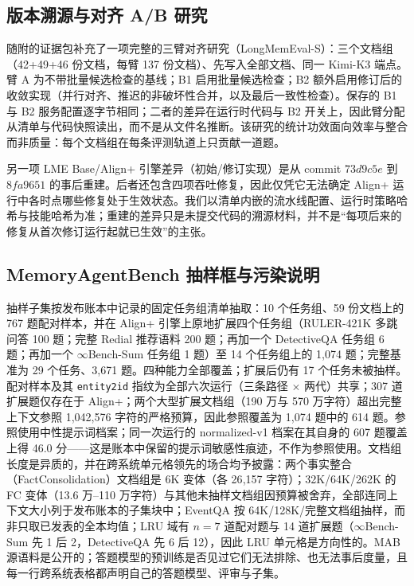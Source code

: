 \subsection{版本溯源与对齐 A/B 研究}
\label{app:alignment-ab}

随附的证据包补充了一项完整的三臂对齐研究（LongMemEval-S）：三个文档组（42+49+46 份文档，每臂 137 份文档）、先写入全部文档、同一 Kimi-K3 端点。臂 A 为不带批量候选检查的基线；B1 启用批量候选检查；B2 额外启用修订后的收敛实现（并行对齐、推迟的非破坏性合并，以及最后一致性检查）。保存的 B1 与 B2 服务配置逐字节相同；二者的差异在运行时代码与 B2 开关上，因此臂分配从清单与代码快照读出，而不是从文件名推断。该研究的统计功效面向效率与整合而非质量：每个文档组在每条评测轨道上只贡献一道题。

另一项 LME Base/Align+ 引擎差异（初始/修订实现）是从 commit $73d9c5e$ 到 $8fa9651$ 的事后重建。后者还包含四项吞吐修复，因此仅凭它无法确定 Align+ 运行中各时点哪些修复处于生效状态。我们以清单内嵌的流水线配置、运行时策略哈希与技能哈希为准；重建的差异只是未提交代码的溯源材料，并不是“每项后来的修复从首次修订运行起就已生效”的主张。

\subsection{MemoryAgentBench 抽样框与污染说明}
\label{app:sampling}

抽样子集按发布账本中记录的固定任务组清单抽取：10 个任务组、59 份文档上的 767 题配对样本，并在 Align+ 引擎上原地扩展四个任务组（RULER-421K 多跳问答 100 题；完整 Redial 推荐语料 200 题；再加一个 DetectiveQA 任务组 6 题；再加一个 $\infty$Bench-Sum 任务组 1 题）至 14 个任务组上的 1{,}074 题；完整基准为 29 个任务、3{,}671 题。四种能力全部覆盖；扩展后仍有 17 个任务未被抽样。配对样本及其 \texttt{entity2id} 指纹为全部六次运行（三条路径 $\times$ 两代）共享；307 道扩展题仅存在于 Align+；两个大型扩展文档组（190 万与 570 万字符）超出完整上下文参照 1{,}042{,}576 字符的严格预算，因此参照覆盖为 1{,}074 题中的 614 题。参照使用中性提示词档案；同一次运行的 normalized-v1 档案在其自身的 607 题覆盖上得 46.0 分——这是账本中保留的提示词敏感性痕迹，不作为参照使用。文档组长度是异质的，并在跨系统单元格领先的场合均予披露：两个事实整合（FactConsolidation）文档组是 6K 变体（各 26{,}157 字符）；32K/64K/262K 的 FC 变体（13.6 万--110 万字符）与其他未抽样文档组因预算被舍弃，全部连同上下文大小列于发布账本的子集块中；EventQA 按 64K/128K/完整文档组抽样，而非只取已发表的全本均值；LRU 域有 $n{=}7$ 道配对题与 14 道扩展题（$\infty$Bench-Sum 先 1 后 2，DetectiveQA 先 6 后 12），因此 LRU 单元格是方向性的。MAB 源语料是公开的；答题模型的预训练是否见过它们无法排除、也无法事后度量，且每一行跨系统表格都声明自己的答题模型、评审与子集。

